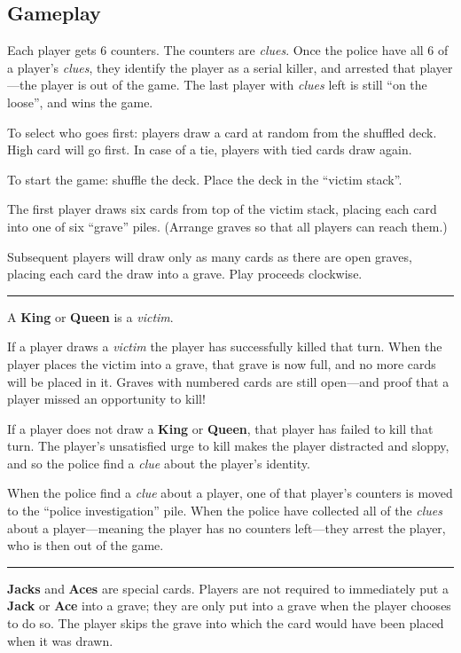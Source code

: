 \documentclass[]{article}
\begin{document}
\subsection{Gameplay}\label{gameplay}

Each player gets 6 counters. The counters are \emph{clues}. Once the
police have all 6 of a player's \emph{clues}, they identify the player
as a serial killer, and arrested that player---the player is out of the
game. The last player with \emph{clues} left is still ``on the loose'',
and wins the game.

To select who goes first: players draw a card at random from the
shuffled deck. High card will go first. In case of a tie, players with
tied cards draw again.

To start the game: shuffle the deck. Place the deck in the ``victim
stack''.

The first player draws six cards from top of the victim stack, placing
each card into one of six ``grave'' piles. (Arrange graves so that all
players can reach them.)

Subsequent players will draw only as many cards as there are open
graves, placing each card the draw into a grave. Play proceeds
clockwise.\smallskip\hrule\smallskip

A \textbf{King} or \textbf{Queen} is a \emph{victim}.

If a player draws a \emph{victim} the player has successfully killed
that turn. When the player places the victim into a grave, that grave is
now full, and no more cards will be placed in it. Graves with numbered
cards are still open---and proof that a player missed an opportunity to
kill!

If a player does not draw a \textbf{King} or \textbf{Queen}, that player
has failed to kill that turn. The player's unsatisfied urge to kill
makes the player distracted and sloppy, and so the police find a
\emph{clue} about the player's identity.

When the police find a \emph{clue} about a player, one of that player's
counters is moved to the ``police investigation'' pile. When the police
have collected all of the \emph{clues} about a player---meaning the
player has no counters left---they arrest the player, who is then out of
the game.\smallskip\hrule\smallskip

\textbf{Jacks} and \textbf{Aces} are special cards. Players are not
required to immediately put a \textbf{Jack} or \textbf{Ace} into a
grave; they are only put into a grave when the player chooses to do so.
The player skips the grave into which the card would have been placed
when it was drawn.
\end{document}

